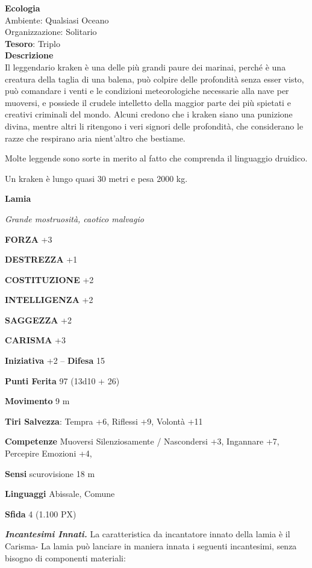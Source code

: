 \begin{multicols}{2}
\textbf{Ecologia}\\
Ambiente: Qualsiasi Oceano\\
Organizzazione: Solitario\\
\textbf{Tesoro}: Triplo\\
\textbf{Descrizione}\\
Il leggendario kraken è una delle più grandi paure dei marinai, perché è una creatura della taglia di una balena, può colpire delle profondità senza esser visto, può comandare i venti e le condizioni meteorologiche necessarie alla nave per muoversi, e possiede il crudele intelletto della maggior parte dei più spietati e creativi criminali del mondo. Alcuni credono che i kraken siano una punizione divina, mentre altri li ritengono i veri signori delle profondità, che considerano le razze che respirano aria nient'altro che bestiame.

Molte leggende sono sorte in merito al fatto che comprenda il linguaggio druidico.

Un kraken è lungo quasi 30 metri e pesa 2000 kg.


\medskip{}\textbf{Lamia}

\textit{Grande mostruosità, caotico malvagio}

\textbf{FORZA} +3

\textbf{DESTREZZA} +1

\textbf{COSTITUZIONE} +2

\textbf{INTELLIGENZA} +2

\textbf{SAGGEZZA} +2

\textbf{CARISMA} +3

\textbf{Iniziativa} +2 -- \textbf{Difesa} 15

\textbf{Punti Ferita} 97 (13d10 + 26)

\textbf{Movimento} 9 m

\textbf{Tiri Salvezza}: Tempra +6, Riflessi +9, Volontà +11

\textbf{Competenze} Muoversi Silenziosamente / Nascondersi +3, Ingannare +7, Percepire Emozioni +4,

\textbf{Sensi} scurovisione 18 m

\textbf{Linguaggi} Abissale, Comune

\textbf{Sfida} 4 (1.100 PX)

\textit{\textbf{Incantesimi Innati.}} La caratteristica da incantatore innato della lamia è il Carisma- La lamia può lanciare in maniera innata i seguenti incantesimi, senza bisogno di componenti materiali:


\end{multicols}
